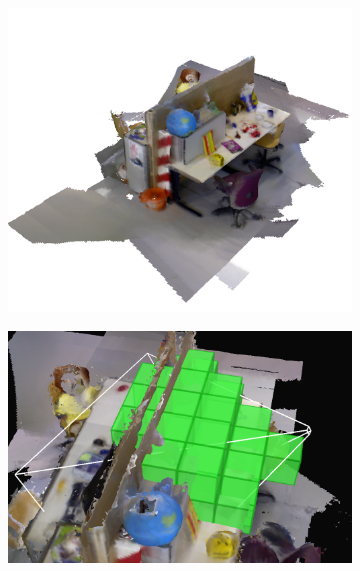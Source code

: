 \documentclass[10pt,twocolumn,letterpaper]{article}
\begin{document}
\begin{figure}
\begin{minipage} {0.25\linewidth}
 		\begin{subfigure}{1.0\linewidth} \centering
		\includegraphics[width=1.0\textwidth]{img/freiburg_2m.png}
		 \caption{} 
		 \label{fig:freiburg_2m}
	 \end{subfigure}  
	 \end{minipage}
    \begin{minipage}{0.25\linewidth}
	  \begin{subfigure}{\linewidth} \centering
	      \includegraphics[width=1.0\textwidth]{img/frustum_cull}
	      \caption{}
	 	 \label{fig:frustum_cull}
	  \end{subfigure}
	  \begin{subfigure}{\linewidth} \centering

\end{subfigure}
\end{minipage}
\end{figure}
\end{document}
